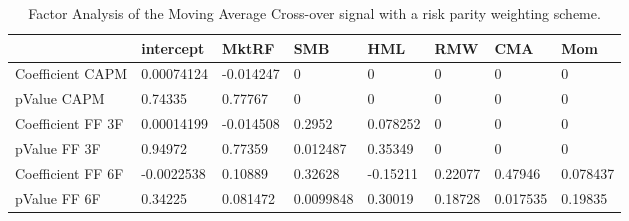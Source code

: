 \begin{table}[H]
\centering
\begin{tabular}{llllllll}
\hline& intercept & MktRF & SMB & HML & RMW & CMA & Mom \\ 
\hline 
Coefficient CAPM & 0.00074124 & -0.014247 & 0 & 0 & 0 & 0 & 0 \\ 
pValue CAPM & 0.74335 & 0.77767 & 0 & 0 & 0 & 0 & 0 \\ 
Coefficient FF 3F & 0.00014199 & -0.014508 & 0.2952 & 0.078252 & 0 & 0 & 0 \\ 
pValue FF 3F & 0.94972 & 0.77359 & 0.012487 & 0.35349 & 0 & 0 & 0 \\ 
Coefficient FF 6F & -0.0022538 & 0.10889 & 0.32628 & -0.15211 & 0.22077 & 0.47946 & 0.078437 \\ 
pValue FF 6F & 0.34225 & 0.081472 & 0.0099848 & 0.30019 & 0.18728 & 0.017535 & 0.19835 \\ 
\hline
\end{tabular}
\caption{Factor Analysis of the Moving Average Cross-over signal with a risk parity weighting scheme.}
\label{MARP_FACTOR}
\end{table}